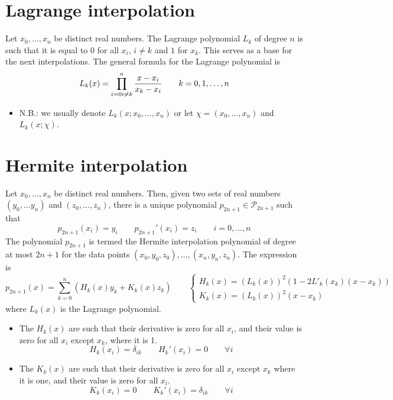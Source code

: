 \documentclass[12pt, openany]{report}
\theoremstyle{definition}
\begin{document}
\section{Lagrange interpolation}
Let \(x_0,\dots,x_n\) be distinct real numbers. The Lagrange polynomial \(L_k\) of degree \(n\) is such that it is equal to 0 for all \(x_i\), \(i\neq k\) and \(1\) for \(x_k\). This serves as a base for the next interpolations. The general formula for the Lagrange polynomial is 
\begin{equation}
    L_k(x) = \prod_{i=0\\i\neq k}^n \frac{x-x_i}{x_k-x_i}\qquad k=0,1,\dots,n
\end{equation}
\begin{itemize}
    \item N.B.: we usually denote \(L_k(x;x_0,\dots,x_n)\) or let \(\chi = (x_0,\dots,x_n)\) and \(L_k(x;\chi)\). 
\end{itemize}
\section{Hermite interpolation}
Let \(x_0,\dots,x_n\) be distinct real numbers. Then, given two sets of real numbers \((y_0,\dots y_n)\) and \((z_0,\dots,z_n)\), there is a unique polynomial \(p_{2n+1}\in \mathcal{P}_{2n+1}\) such that 
\begin{equation}
    p_{2n+1} (x_i) = y_i \qquad p_{2n+1}'(x_i) =z_i \qquad i=0,\dots,n
\end{equation}
The polynomial \(p_{2n+1}\) is termed the Hermite interpolation polynomial of degree at most \(2n+1\) for the data points \((x_0,y_0,z_0),\dots,(x_n,y_n,z_n)\). The expression is 
\begin{equation}
    p_{2n+1}(x) = \sum_{k=0}^n \left(H_k(x)y_k + K_k(x)z_k\right) \qquad \begin{cases}
        H_k(x) = (L_k(x))^2(1-2L'_k(x_k)(x-x_k))\\
        K_k(x) = (L_k(x))^2(x-x_k)
    \end{cases}
\end{equation}
where \(L_k(x)\) is the Lagrange polynomial.
\begin{itemize}
    \item The \(H_k(x)\) are such that their derivative is zero for all \(x_i\), and their value is zero for all \(x_i\) except \(x_k\), where it is 1.\[H_k(x_i) = \delta_{ik}\qquad H_k'(x_i) = 0 \qquad \forall i\]
    \item The \(K_k(x)\) are such that their derivative is zero for all \(x_i\) except \(x_k\) where it is one, and their value is zero for all \(x_i\).\[K_k(x_i) = 0\qquad K_k'(x_i) = \delta_{ik} \qquad \forall i\]
\end{itemize}
\end{document}
